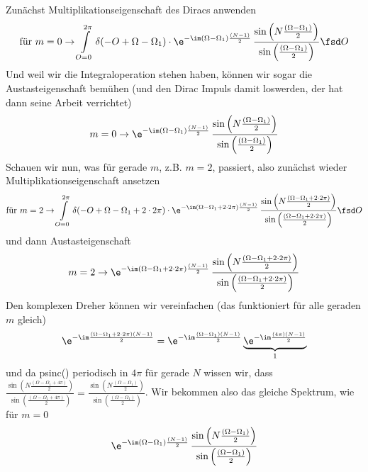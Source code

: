 \begin{ExCalc}
Zunächst Multiplikationseigenschaft des Diracs anwenden
\begin{align}
\text{für   }m=0\rightarrow
\int\limits_{O=0}^{2\pi}
\delta(-O+\Omega-\Omega_1)
\cdot
\e^{-\im(\Omega-\Omega_1)\frac{(N-1)}{2}}\,
\frac{\sin\left(N\frac{(\Omega-\Omega_1)}{2}\right)}{\sin\left(\frac{(\Omega-\Omega_1)}{2}\right)}\fsd O
\end{align}
Und weil wir die Integraloperation stehen haben, können wir sogar die
Austasteigenschaft bemühen (und den Dirac Impuls damit loswerden, der hat dann seine Arbeit verrichtet)
\begin{align}
m=0\rightarrow
\e^{-\im(\Omega-\Omega_1)\frac{(N-1)}{2}}\,
\frac{\sin\left(N\frac{(\Omega-\Omega_1)}{2}\right)}{\sin\left(\frac{(\Omega-\Omega_1)}{2}\right)}
\end{align}
%
Schauen wir nun, was für gerade $m$, z.B. $m=2$, passiert, also zunächst wieder Multiplikationseigenschaft
ansetzen
\begin{align}
\text{für   }m=2\rightarrow
\int\limits_{O=0}^{2\pi}
\delta(-O+\Omega-\Omega_1+2 \cdot 2\pi)
\cdot
\e^{-\im(\Omega-\Omega_1 +2 \cdot  2\pi)\frac{(N-1)}{2}}\,
\frac{\sin\left(N\frac{(\Omega-\Omega_1 + 2 \cdot 2\pi)}{2}\right)}{\sin\left(\frac{(\Omega-\Omega_1 + 2 \cdot 2\pi)}{2}\right)}\fsd O
\end{align}
und dann Austasteigenschaft
\begin{align}
m=2\rightarrow
\e^{-\im(\Omega-\Omega_1 +2 \cdot  2\pi)\frac{(N-1)}{2}}\,
\frac{\sin\left(N\frac{(\Omega-\Omega_1 + 2 \cdot 2\pi)}{2}\right)}{\sin\left(\frac{(\Omega-\Omega_1 + 2 \cdot 2\pi)}{2}\right)}
\end{align}
%
Den komplexen Dreher können wir vereinfachen (das funktioniert für alle geraden $m$ gleich)
\begin{align}
\e^{-\im\frac{(\Omega-\Omega_1 + 2 \cdot 2\pi)(N-1)}{2}} =
\e^{-\im\frac{(\Omega-\Omega_1)(N-1)}{2}}
\underbrace{\e^{-\im\frac{(4\pi)(N-1)}{2}}}_{1}
\end{align}
und da psinc() periodisch in $4\pi$ für gerade $N$ wissen wir, dass
$\frac{\sin\left(N\frac{(\Omega-\Omega_1 + 4\pi)}{2}\right)}{\sin\left(\frac{(\Omega-\Omega_1 + 4\pi)}{2}\right)} = \frac{\sin\left(N\frac{(\Omega-\Omega_1)}{2}\right)}{\sin\left(\frac{(\Omega-\Omega_1)}{2}\right)}$.
Wir bekommen also das gleiche Spektrum, wie für $m=0$
\begin{align}
\e^{-\im (\Omega-\Omega_1) \frac{(N-1)}{2}}\,
\frac{\sin\left(N\frac{(\Omega-\Omega_1)}{2}\right)}{\sin\left(\frac{(\Omega-\Omega_1)}{2}\right)}
\end{align}

\end{ExCalc}

